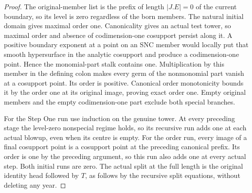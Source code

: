 \begin{proof}
The original-member list is the prefix of length $|J.E|=0$ of the current
boundary, so its level is zero regardless of the born members. The natural
initial domain gives maximal order one. Canonicality gives an actual test
tower, so maximal order and absence of codimension-one cosupport persist
along it. A positive boundary exponent at a point on an SNC member would
locally put that smooth hypersurface in the analytic cosupport and produce
a codimension-one point. Hence the monomial-part stalk contains one.
Multiplication by this member in the defining colon makes every germ of
the nonmonomial part vanish at a cosupport point. Its order is positive.
Canonical order monotonicity bounds it by the order one at its original
image, proving exact order one. Empty original members and the empty
codimension-one part exclude both special branches.

For the Step One run use induction on the genuine tower. At every preceding
stage the level-zero nonspecial regime holds, so its recursive run adds one
at each actual blowup, even when its centre is empty. For the order run,
every image of a final cosupport point is a cosupport point at the preceding
canonical prefix. Its order is one by the preceding argument, so this run
also adds one at every actual step. Both initial runs are zero. The actual
split at the full length is the original identity head followed by $T$,
as follows by the recursive split equations, without deleting any year.
\end{proof}

